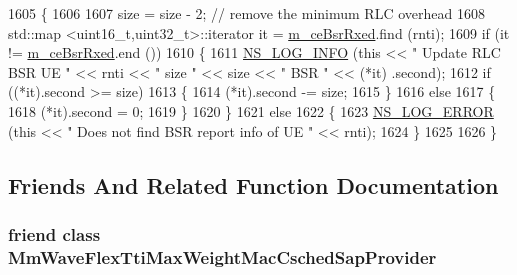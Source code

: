 \begin{DoxyCode}
1605 \{
1606 
1607   size = size - 2; \textcolor{comment}{// remove the minimum RLC overhead}
1608   std::map <uint16\_t,uint32\_t>::iterator it = \hyperlink{classns3_1_1MmWaveFlexTtiMaxWeightMacScheduler_a62257924c5d3720000812905ed679dfd}{m\_ceBsrRxed}.find (rnti);
1609   \textcolor{keywordflow}{if} (it != \hyperlink{classns3_1_1MmWaveFlexTtiMaxWeightMacScheduler_a62257924c5d3720000812905ed679dfd}{m\_ceBsrRxed}.end ())
1610     \{
1611       \hyperlink{group__logging_gafbd73ee2cf9f26b319f49086d8e860fb}{NS\_LOG\_INFO} (\textcolor{keyword}{this} << \textcolor{stringliteral}{" Update RLC BSR UE "} << rnti << \textcolor{stringliteral}{" size "} << size << \textcolor{stringliteral}{" BSR "} << (*it)
      .second);
1612       \textcolor{keywordflow}{if} ((*it).second >= size)
1613         \{
1614           (*it).second -= size;
1615         \}
1616       \textcolor{keywordflow}{else}
1617         \{
1618           (*it).second = 0;
1619         \}
1620     \}
1621   \textcolor{keywordflow}{else}
1622     \{
1623       \hyperlink{group__logging_ga0261a8db1d4ac5f79417d117634fd455}{NS\_LOG\_ERROR} (\textcolor{keyword}{this} << \textcolor{stringliteral}{" Does not find BSR report info of UE "} << rnti);
1624     \}
1625 
1626 \}
\end{DoxyCode}


\subsection{Friends And Related Function Documentation}
\subsubsection[{\texorpdfstring{Mm\+Wave\+Flex\+Tti\+Max\+Weight\+Mac\+Csched\+Sap\+Provider}{MmWaveFlexTtiMaxWeightMacCschedSapProvider}}]{\setlength{\rightskip}{0pt plus 5cm}friend class {\bf Mm\+Wave\+Flex\+Tti\+Max\+Weight\+Mac\+Csched\+Sap\+Provider}\hspace{0.3cm}{\ttfamily [friend]}}\hypertarget{classns3_1_1MmWaveFlexTtiMaxWeightMacScheduler_a0926a668459ef2930ea42b79e8216e1d}{}\label{classns3_1_1MmWaveFlexTtiMaxWeightMacScheduler_a0926a668459ef2930ea42b79e8216e1d}

